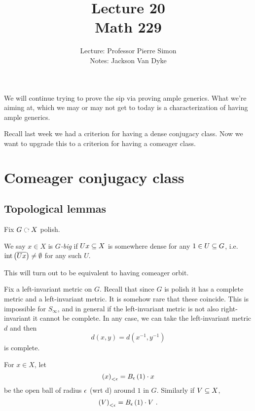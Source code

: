 \documentclass{amsart}
\begin{document}
\title{Lecture 20\\ Math 229}
\author{Lecture: Professor Pierre Simon\\ Notes: Jackson Van Dyke}
\maketitle

We will continue trying to prove the sip via proving ample generics. 
What we're aiming at, which we may or may not get to today is a
characterization of having ample generics.

Recall last week we had a criterion for having a dense conjugacy class. 
Now we want to upgrade this to a criterion for having a comeager class.

\section{Comeager conjugacy class}

\subsection{Topological lemmas}

Fix $G\acts X$ polish.

\begin{defn}
We say $x\in X$ is \emph{$G$-big} if $Ux\subseteq X$ is somewhere dense 
for any $1\in U \subseteq G$, i.e. $\operatorname{int}\left(\overline{U x}\right)\neq \emptyset$ for any such $U$.
\end{defn}

This will turn out to be equivalent to having comeager orbit. 

Fix a left-invariant metric on $G$. 
Recall that since $G$ is polish it has a complete metric and a left-invariant metric.
It is somehow rare that these coincide.
This is impossible for $S_\infty$, and in general
if the left-invariant metric is not also right-invariant it cannot be complete. 
In any case, we can take the left-invariant metric $d$ and then
\begin{equation}
d\left(x,y\right) = d\left(x^{-1} , y^{-1}\right)
\end{equation}
is complete. 

For $x\in X$, let
\begin{equation}
\left(x\right)_{<\epsilon} = B_\epsilon\left(1\right)\cdot x
\end{equation}
be the open ball of radius $\epsilon$ (wrt d) around $1$ in $G$. Similarly if $V\subseteq X$, 
\begin{equation}
\left(V\right)_{<\epsilon} = B_\epsilon\left(1\right)\cdot V \ .
\end{equation}
\end{document}
